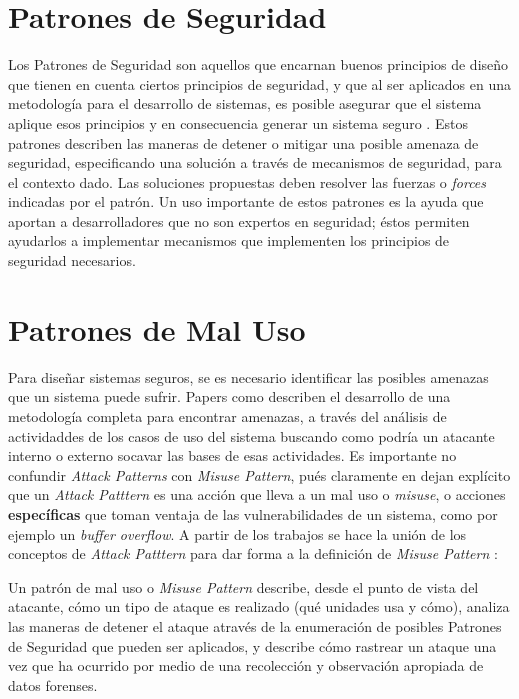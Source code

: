 \section{Patrones de Seguridad}
\label{chap2:SecPatt}
Los Patrones de Seguridad son aquellos que encarnan buenos principios de diseño que tienen en cuenta ciertos principios de seguridad, y que al ser aplicados en una metodología para el desarrollo de sistemas, es posible asegurar que el sistema aplique esos principios y en consecuencia generar un sistema seguro \cite{fernandez2004methodology, fernandez2013security}. Estos patrones describen las maneras de detener o mitigar una posible amenaza de seguridad, especificando una solución a través de mecanismos de seguridad, para el contexto dado. Las soluciones propuestas deben resolver las fuerzas o \textit{forces} indicadas por el patrón. Un uso importante de estos patrones es la ayuda que aportan a desarrolladores que no son expertos en seguridad; éstos permiten ayudarlos a implementar mecanismos que implementen los principios de seguridad necesarios.

\section{Patrones de Mal Uso}
Para diseñar sistemas seguros, se es necesario identificar las posibles amenazas que un sistema puede sufrir. Papers como \cite{fernandez2006defining, fernandez2007attack, braz2008elicitin, fernandez2013security} describen el desarrollo de una metodología completa para encontrar amenazas, a través del análisis de actividaddes de los casos de uso del sistema buscando como podría un atacante interno o externo socavar las bases de esas actividades. Es importante no confundir \textit{Attack Patterns} con \textit{Misuse Pattern}, pués claramente en \cite{ModMisusePatt, fernandez2013security} dejan explícito que un \textit{Attack Patttern} es una acción que lleva a un mal uso o \textit{misuse}, o acciones \textbf{específicas} que toman ventaja de las vulnerabilidades de un sistema, como por ejemplo un \textit{buffer overflow}. A partir de los trabajos \cite{fernandez2007attack, yoshioka2006development, yoshioka2007integration}  se hace la unión de los conceptos de \textit{Attack Patttern} para dar forma a la definición de \textit{Misuse Pattern} \cite{ModMisusePatt, pelaez2009misuse, fernandez2010worm, hashizume2011misuse, munoz2011misuse, fernandez2012misuse, alkazimi2014, encinamisuse}:
\begin{center}
    Un patrón de mal uso o \textit{Misuse Pattern} describe, desde el punto de vista del atacante, cómo un tipo de ataque es realizado (qué unidades usa y cómo), analiza las maneras de detener el ataque através de la enumeración de posibles Patrones de Seguridad que pueden ser aplicados, y describe cómo rastrear un ataque una vez que ha ocurrido por medio de una recolección y observación apropiada de datos forenses.
\end{center}

